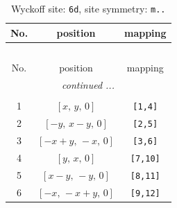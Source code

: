 \documentclass[fleqn,8pt]{jsarticle}
\begin{document}
\renewcommand{\arraystretch}{1.2}
\begin{longtable}{ccc}
\caption{Wyckoff site: {\tt 6d}, site symmetry: {\tt m..}}
 \\
 \hline \hline
No. & position & mapping \\ \hline \endfirsthead

\multicolumn{2}{l}{\tablename\ \thetable{}} \\
 \hline \hline
No. & position & mapping \\ \hline \endhead

 \hline \hline
\multicolumn{2}{r}{\footnotesize\it continued ...} \\ \endfoot

 \hline \hline
\multicolumn{2}{r}{} \\ \endlastfoot

1 & $\left[ x,\, y,\, 0 \right]$ & {\tt [1,4]} \\ \hline
2 & $\left[ - y,\, x - y,\, 0 \right]$ & {\tt [2,5]} \\ \hline
3 & $\left[ - x + y,\, - x,\, 0 \right]$ & {\tt [3,6]} \\ \hline
4 & $\left[ y,\, x,\, 0 \right]$ & {\tt [7,10]} \\ \hline
5 & $\left[ x - y,\, - y,\, 0 \right]$ & {\tt [8,11]} \\ \hline
6 & $\left[ - x,\, - x + y,\, 0 \right]$ & {\tt [9,12]} \\
\end{longtable}
\renewcommand{\arraystretch}{1.2}
\end{document}
